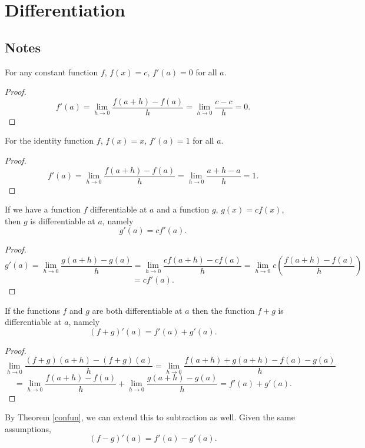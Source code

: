 \section{Differentiation}

\subsection{Notes}
\begin{theorem}
For any constant function $f$, $f(x) = c$, $f'(a) = 0$ for all $a$.

\begin{proof}
\[ f'(a) = \lim_{h \to 0} \frac{f(a+h)-f(a)}{h} = \lim_{h \to 0} \frac{c-c}{h} = 0. \]
\end{proof}
\end{theorem}

\begin{theorem}
For the identity function $f$, $f(x) = x$, $f'(a) = 1$ for all $a$. 

\begin{proof}
\[ f'(a) = \lim_{h \to 0} \frac{f(a+h)-f(a)}{h} = \lim_{h \to 0} \frac{a+h-a}{h} = 1. \]
\end{proof}
\end{theorem}

\begin{theorem} \label{confun}
If we have a function $f$ differentiable at $a$ and a function $g$, $g(x) = cf(x)$, then $g$ is differentiable at $a$, namely
\[ g'(a) = cf'(a). \]

\begin{proof}
\[ g'(a) = \lim_{h \to 0} \frac{g(a+h)-g(a)}{h} = \lim_{h \to 0} \frac{cf(a+h)-cf(a)}{h} = \lim_{h \to 0} c\left(\frac{f(a+h)-f(a)}{h}\right) \]
\[ = cf'(a). \]
\end{proof}
\end{theorem}

\begin{theorem}
If the functions $f$ and $g$ are both differentiable at $a$ then the function $f + g$ is differentiable at $a$, namely
\[ (f + g)'(a) = f'(a) + g'(a). \]

\begin{proof}
\[ \lim_{h \to 0} \frac{(f+g)(a+h)-(f+g)(a)}{h} = \lim_{h \to 0} \frac{f(a+h)+g(a+h)-f(a)-g(a)}{h} \]
\[ = \lim_{h \to 0} \frac{f(a+h) - f(a)}{h} + \lim_{h \to 0} \frac{g(a+h)-g(a)}{h} = f'(a) + g'(a). \]
\end{proof}
\end{theorem}

\begin{remark}
By Theorem \ref{confun}, we can extend this to subtraction as well. Given the same assumptions, 
\[ (f - g)'(a) = f'(a) - g'(a). \]
\end{remark}

